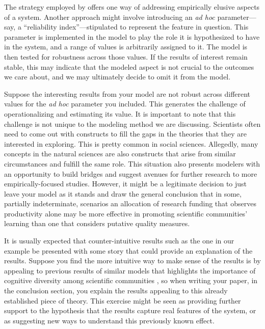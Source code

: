 \documentclass{article}
\begin{document}
The strategy employed by  offers one way of addressing empirically elusive aspects of a system. Another approach might involve introducing an \textit{ad hoc} parameter—say, a “reliability index”—stipulated to represent the feature in question. This parameter is implemented in the model to play the role it is hypothesized to have in the system, and a range of values is arbitrarily assigned to it. The model is then tested for robustness across those values. If the results of interest remain stable, this may indicate that the modeled aspect is not crucial to the outcomes we care about, and we may ultimately decide to omit it from the model.

Suppose the interesting results from your model are not robust across different values for the \textit{ad hoc} parameter you included. This generates the challenge of operationalizing and estimating its value. It is important to note that this challenge is not unique to the modeling method we are discussing. Scientists often need to come out with constructs to fill the gaps in the theories that they are interested in exploring. This is pretty common in social sciences. Allegedly, many concepts in the natural sciences are also constructs that arise from similar circumstances and fulfill the same role. This situation also presents modelers with an opportunity to build bridges and suggest avenues for further research to more empirically-focused studies. However, it might be a legitimate decision to just leave your model as it stands and draw the general conclusion that in some, partially indeterminate, scenarios an allocation of research funding that observes productivity alone may be more effective in promoting scientific communities' learning than one that considers putative quality measures.

It is usually expected that counter-intuitive results such as the one in our example be presented with some story that could provide an explanation of the results. Suppose you find the more intuitive way to make sense of the results is by appealing to previous results of similar models that highlights the importance of cognitive diversity among scientific communities \cite<as in>{Zollman2010-ZOLTEB-2}, so when writing your paper, in the conclusion section, you explain the results appealing to this already established piece of theory. This exercise might be seen as providing further support to the hypothesis that the results capture real features of the system, or as suggesting new ways to understand this previously known effect.
\end{document}

